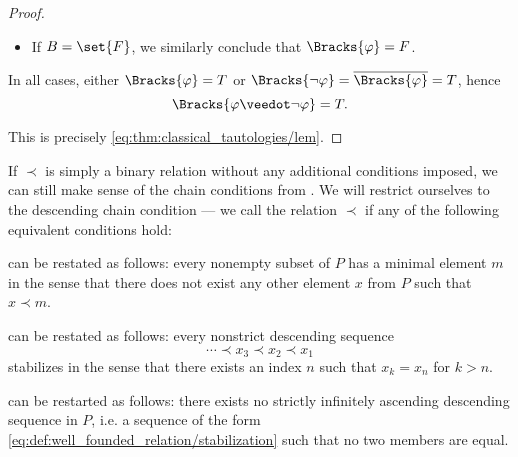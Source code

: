 \begin{proof}
\begin{itemize}
\begin{itemize}
      \item If \( B = \set{ F } \), we similarly conclude that \( \Bracks{\varphi} = F \).
    \end{itemize}
  \end{itemize}

  In all cases, either \( \Bracks{\varphi} = T \) or \( \Bracks{\neg \varphi} = \oline{\Bracks{\varphi}} = T \), hence
  \begin{equation*}
    \Bracks{\varphi \synvee \neg \varphi} = T.
  \end{equation*}

  This is precisely \eqref{eq:thm:classical_tautologies/lem}.
\end{proof}

\begin{definition}\label{def:well_founded_relation}
  If \( \prec \) is simply a binary relation without any additional conditions imposed, we can still make sense of the chain conditions from . We will restrict ourselves to the descending chain condition --- we call the relation \( \prec \)  if any of the following equivalent conditions hold:

  \begin{thmenum}
      can be restated as follows: every nonempty subset of \( P \) has a minimal element \( m \) in the sense that there does not exist any other element \( x \) from \( P \) such that \( x \prec m \).

      can be restated as follows: every nonstrict descending sequence
    \begin{equation}\label{eq:def:well_founded_relation/stabilization}
      \cdots \prec x_3 \prec x_2 \prec x_1
    \end{equation}
    stabilizes in the sense that there exists an index \( n \) such that \( x_k = x_n \) for \( k > n \).

      can be restarted as follows: there exists no strictly infinitely ascending descending sequence in \( P \), i.e. a sequence of the form \eqref{eq:def:well_founded_relation/stabilization} such that no two members are equal.
  \end{thmenum}
\end{definition}

